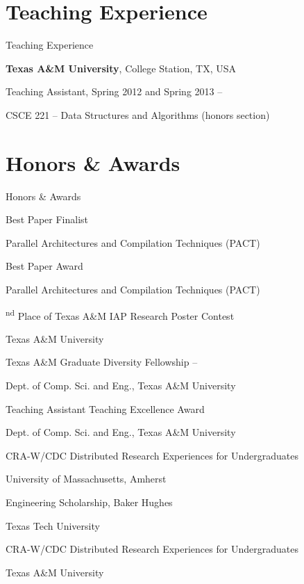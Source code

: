 \documentclass[a4paper,10pt,oneside]{article}
\begin{document}
\begin{body}
\section{Teaching Experience}
{Teaching Experience}

{\textbf{Texas A\&M University}},
College Station, TX, USA
\par
Teaching Assistant, Spring 2012 and Spring 2013
\hfill
{} --
\begin{detail}
CSCE 221 -- Data Structures and Algorithms (honors section)
\end{detail}




\section{Honors \& Awards}
{Honors\newline
\& Awards}

Best Paper Finalist
\hfill
{}
\par
Parallel Architectures and Compilation Techniques (PACT)

\EntryGap
Best Paper Award
\hfill
{}
\par
Parallel Architectures and Compilation Techniques (PACT)

\textsuperscript{nd} Place of Texas A\&M IAP Research Poster Contest
\hfill
{}
\par
Texas A\&M University

\EntryGap
Texas A\&M Graduate Diversity Fellowship
\hfill
{}--
\par
Dept. of Comp. Sci. and Eng., Texas A\&M University

\EntryGap
Teaching Assistant Teaching Excellence Award
\hfill
{}
\par
Dept. of Comp. Sci. and Eng., Texas A\&M University

\EntryGap
CRA-W/CDC Distributed Research Experiences for Undergraduates
\hfill
{}
\par
University of Massachusetts, Amherst

\EntryGap
Engineering Scholarship,
Baker Hughes
\hfill
{}
\par
Texas Tech University

\EntryGap
CRA-W/CDC Distributed Research Experiences for Undergraduates
\hfill
{}
\par
Texas A\&M University


\end{body}
\end{document}
